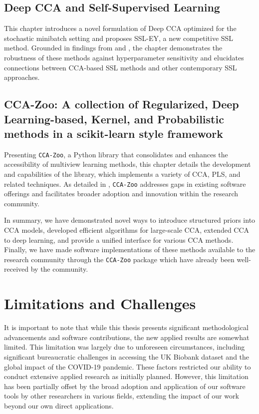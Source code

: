 \subsection{Deep CCA and Self-Supervised
Learning}
This chapter introduces a novel formulation of Deep CCA optimized for the stochastic minibatch setting and proposes SSL-EY, a new competitive SSL method. Grounded in findings from \citep{chapman2023cca} and \citep{chapman2023efficient}, the chapter demonstrates the robustness of these methods against hyperparameter sensitivity and elucidates connections between CCA-based SSL methods and other contemporary SSL approaches.

\subsection{CCA-Zoo: A collection of Regularized, Deep Learning-based, Kernel, and Probabilistic methods in a scikit-learn style framework}
Presenting \texttt{CCA-Zoo}, a Python library that consolidates and enhances the accessibility of multiview learning methods, this chapter details the development and capabilities of the library, which implements a variety of CCA, PLS, and related techniques. As detailed in \citep{chapman2021cca}, \texttt{CCA-Zoo} addresses gaps in existing software offerings and facilitates broader adoption and innovation within the research community.

In summary, we have demonstrated novel ways to introduce structured priors into CCA models, developed efficient algorithms for large-scale CCA, extended CCA to deep learning, and provide a unified interface for various CCA methods. Finally, we have made software implementations of these methods available to the research community through the \texttt{CCA-Zoo} package which have already been well-received by the community.

\section{Limitations and Challenges}

It is important to note that while this thesis presents significant methodological advancements and software contributions, the new applied results are somewhat limited. This limitation was largely due to unforeseen circumstances, including significant bureaucratic challenges in accessing the UK Biobank dataset and the global impact of the COVID-19 pandemic. These factors restricted our ability to conduct extensive applied research as initially planned. However, this limitation has been partially offset by the broad adoption and application of our software tools by other researchers in various fields, extending the impact of our work beyond our own direct applications.

